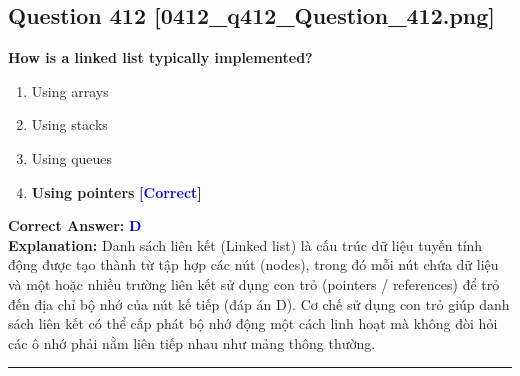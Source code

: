 \documentclass[11pt,a4paper]{article}
\begin{document}
\begin{minipage}{\textwidth}
\subsection*{Question 412 \quad \footnotesize{[0412\_q412\_Question\_412.png]}}
\noindent \textbf{How is a linked list typically implemented?}

\begin{enumerate}[label=\Alph*.]
    \item Using arrays
    \item Using stacks
    \item Using queues
    \item \textbf{Using pointers} \hfill \textcolor{blue}{\textbf{[Correct]}}
\end{enumerate}

\noindent \textbf{Correct Answer:} \textcolor{blue}{\textbf{D}} \\[2pt]
\noindent \textbf{Explanation:} Danh sách liên kết (Linked list) là cấu trúc dữ liệu tuyến tính động được tạo thành từ tập hợp các nút (nodes), trong đó mỗi nút chứa dữ liệu và một hoặc nhiều trường liên kết sử dụng con trỏ (pointers / references) để trỏ đến địa chỉ bộ nhớ của nút kế tiếp (đáp án D). Cơ chế sử dụng con trỏ giúp danh sách liên kết có thể cấp phát bộ nhớ động một cách linh hoạt mà không đòi hỏi các ô nhớ phải nằm liên tiếp nhau như mảng thông thường.

\par\vspace{0.3cm}
\hrule
\vspace{0.3cm}
\end{minipage}
\end{document}
